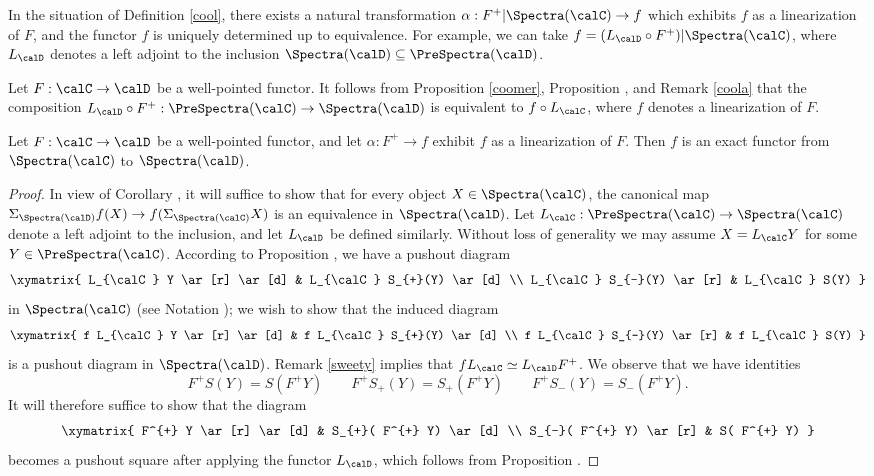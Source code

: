\begin{remark}\label{coola}
In the situation of Definition \ref{cool}, there exists a natural transformation
$\alpha: F^{+}| \Spectra(\calC) \rightarrow f$ which exhibits $f$ as a linearization of $F$,
and the functor $f$ is uniquely determined up to equivalence. For example, we can
take $f = (L_{\calD} \circ F^{+}) | \Spectra(\calC)$, where $L_{\calD}$ denotes a left
adjoint to the inclusion $\Spectra(\calD) \subseteq \PreSpectra(\calD)$.
\end{remark}

\begin{remark}\label{sweety}
Let $F: \calC \rightarrow \calD$ be a well-pointed functor.
It follows from Proposition \ref{coomer}, Proposition , and Remark \ref{coola} that the composition $L_{\calD} \circ F^{+}: \PreSpectra(\calC) \rightarrow \Spectra(\calD)$ is equivalent to $f \circ L_{\calC}$, where $f$ denotes a linearization of $F$.
\end{remark}

\begin{proposition}\label{exman}
Let $F: \calC \rightarrow \calD$ be a well-pointed functor, and let $\alpha: F^{+} \rightarrow f$ exhibit $f$ as a linearization of $F$. Then $f$ is an exact functor from $\Spectra(\calC)$ to $\Spectra(\calD)$.
\end{proposition}

\begin{proof}
In view of Corollary , it will suffice to show that for every object
$X \in \Spectra(\calC)$, the canonical map $\Sigma_{ \Spectra(\calD)} f(X) \rightarrow
f( \Sigma_{ \Spectra(\calC)} X)$ is an equivalence in $\Spectra(\calD)$. Let
$L_{\calC}: \PreSpectra(\calC) \rightarrow \Spectra(\calC)$ denote a left adjoint to the inclusion, and let $L_{\calD}$ be defined similarly. Without loss of generality we may assume $X = L_{\calC} Y$
for some $Y \in \PreSpectra(\calC)$. According to Proposition , we have a pushout diagram
$$ \xymatrix{ L_{\calC} Y \ar[r] \ar[d] & L_{\calC} S_{+}(Y) \ar[d] \\
L_{\calC} S_{-}(Y) \ar[r] & L_{\calC} S(Y) }$$
in $\Spectra(\calC)$ (see Notation ); we wish to show that the induced diagram
$$ \xymatrix{ f L_{\calC} Y \ar[r] \ar[d] & f L_{\calC} S_{+}(Y) \ar[d] \\
f L_{\calC} S_{-}(Y) \ar[r] & f L_{\calC} S(Y) }$$
is a pushout diagram in $\Spectra(\calD)$.
Remark \ref{sweety} implies that $f L_{\calC} \simeq L_{\calD} F^{+}$. We observe
that we have identities 
$$F^{+} S(Y) = S( F^{+} Y) \quad \quad F^{+} S_{+}(Y) = S_{+}( F^{+} Y)
\quad \quad F^{+} S_{-}(Y) = S_{-}( F^{+} Y).$$
It will therefore suffice to show that the diagram
$$ \xymatrix{ F^{+} Y \ar[r] \ar[d] & S_{+}( F^{+} Y) \ar[d] \\
S_{-}( F^{+} Y) \ar[r] & S( F^{+} Y) }$$
becomes a pushout square after applying the functor $L_{\calD}$, which follows from
Proposition .
\end{proof}

